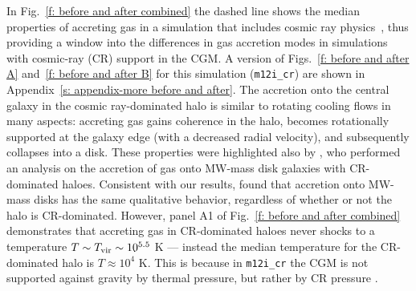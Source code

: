 \documentclass[fleqn,usenatbib]{mnras}
\begin{document}
In Fig.~\ref{f: before and after combined} the dashed line shows the median properties of accreting gas in a simulation that includes cosmic ray physics~\citep[][]{Chan2019, Hopkins2020a}, thus providing a window into the differences in gas accretion modes in simulations with cosmic-ray (CR) support in the CGM.
A version of Figs.~\ref{f: before and after A} and~\ref{f: before and after B} for this simulation (\texttt{m12i\_cr}) are shown in Appendix~\ref{s: appendix-more before and after}.
The accretion onto the central galaxy in the cosmic ray-dominated halo is similar to rotating cooling flows in many aspects:
accreting gas gains coherence in the halo, becomes rotationally supported at the galaxy edge (with a decreased radial velocity), and subsequently collapses into a disk.
These properties were highlighted also by \cite{Trapp2021}, who performed an analysis on the accretion of gas onto MW-mass disk galaxies with CR-dominated haloes.
Consistent with our results, \citeauthor{Trapp2021} found that accretion onto MW-mass disks has the same qualitative behavior, regardless of whether or not the halo is CR-dominated.
However, panel A1 of Fig.~\ref{f: before and after combined} demonstrates that accreting gas in CR-dominated haloes never shocks to a temperature $T \sim T_{\rm vir} \sim 10^{5.5}$ K --- instead the median temperature for the CR-dominated halo is $T\approx10^4$ K.
This is because in \texttt{m12i\_cr} the CGM is not supported against gravity by thermal pressure, but rather by CR pressure \citep{Ji2020}.
\end{document}
